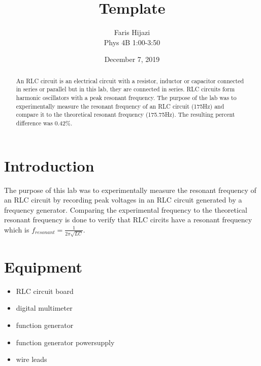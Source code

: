 \documentclass[letterpaper, 12pt]{article}
\title{Template}
\date{December 7, 2019}
\author{Faris Hijazi\\
        Phys 4B 1:00-3:50\\}
\begin{document}
\begin{titlingpage}
    \maketitle
    \begin{abstract}
        An RLC circuit is an electrical circuit with a resistor, inductor or capacitor 
 connected in series or parallel but in this lab, they are connected in series.
 RLC circuits form harmonic oscillators with a peak resonant frequency. The purpose of the 
 lab was to experimentally measure the resonant frequency of an RLC circuit (175Hz) and 
 compare it to the theoretical resonant frequency (175.75Hz). The resulting percent difference
 was 0.42\%.
    \end{abstract}
\end{titlingpage}


\section*{Introduction} 
The purpose of this lab was to experimentally measure 
the resonant frequency of an RLC circuit by recording peak voltages
in an RLC circuit generated by a frequency generator.
Comparing the experimental frequency to the theoretical resonant 
frequency is done to verify that RLC circits have a resonant frequency which is 
$f_{resonant} = \frac{1}{2 \pi \sqrt{L C}}$. 


\section*{Equipment}

\begin{itemize}
    \item RLC circuit board
    \item digital multimeter
    \item function generator
    \item function generator powersupply
    \item wire leads
\end{itemize}
\end{document}
